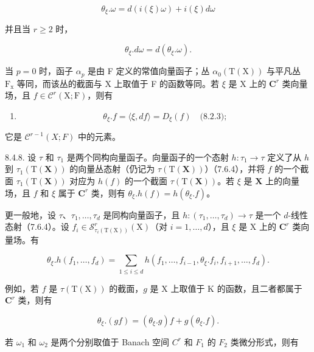 \[
\theta_ {\xi}. \omega = d (i (\xi) \omega) + i (\xi) d \omega\tag{3}
\]

并且当 \(r \geqslant 2\) 时，

\[
\theta_ {\xi}. d \omega = d (\theta_ {\xi}. \omega).\tag{4}
\]

当 \(p=0\) 时，函子 \(\alpha_{p}\) 是由 F 定义的常值向量函子；丛 \(\alpha_{0}(\mathrm{T}(\mathrm{X}))\) 与平凡丛 \(\mathrm{F}_{\mathrm{x}}\) 等同，而该丛的截面与 X 上取值于 F 的函数等同。若 \(\xi\) 是 X 上的 \(\mathbf{C}^{r}\) 类向量场，且 \(f\in\mathcal{C}^{r}(\mathrm{X};\mathrm{F})\)，则有

\begin{enumerate}
\def\labelenumi{(\arabic{enumi})}
\setcounter{enumi}{4}
\tightlist
\item
  \[
  \theta_ {\xi}. f = \langle \xi , d f \rangle = D _ {\xi} (f) \quad \text{(8.2.3)};
  \]
\end{enumerate}

它是 \(\mathcal{C}^{r-1}(X;F)\) 中的元素。

8.4.8. 设 \(\tau\) 和 \(\tau_{1}\) 是两个同构向量函子。向量函子的一个态射 \(h\colon \tau_{1}\to \tau\) 定义了从 \(h\) 到 \(\tau_{1}(\mathrm{T}(\mathbf{X}))\) 的向量丛态射（仍记为 \(\tau (\mathrm{T}(\mathbf{X}))\)）（7.6.4），并将 \(f\) 的一个截面 \(\tau_{1}(\mathrm{T}(\mathbf{X}))\) 对应为 \(h(f)\) 的一个截面 \(\tau (\mathrm{T}(\mathbf{X}))\)。若 \(\xi\) 是 \(\mathbf{X}\) 上的向量场，且 \(f\) 和 \(\xi\) 属于 \(\mathbf{C}^r\) 类，则有 \(\theta_{\xi}.h(f) = h(\theta_{\xi}.f)\)。

更一般地，设 \(\tau\)、\(\tau_{1},\ldots,\tau_{d}\) 是同构向量函子，且 \(h\colon(\tau_{1},\ldots,\tau_{d})\to\tau\) 是一个 \(d\)-线性态射（7.6.4）。设 \(f_{i}\in\mathcal{S}_{\tau_{i}(\mathrm{T}(\mathrm{X}))}^{r}(\mathrm{X})\)（对 \(i=1,\ldots,d\)），且 \(\xi\) 是 X 上的 \(\mathbf{C}^{r}\) 类向量场。有

\[
\theta_ {\xi}. h (f _ {1}, \dots , f _ {d}) = \sum_ {1 \leqslant i \leqslant d} h (f _ {1}, \dots , f _ {i - 1}, \theta_ {\xi}. f _ {i}, f _ {i + 1}, \dots , f _ {d}).\tag{6}
\]

例如，若 \(f\) 是 \(\tau(\mathrm{T}(\mathrm{X}))\) 的截面，\(g\) 是 \(\mathrm{X}\) 上取值于 \(\mathrm{K}\) 的函数，且二者都属于 \(\mathbf{C}^r\) 类，则有

\[
\theta_ {\xi}. (g f) = (\theta_ {\xi}. g) f + g (\theta_ {\xi}. f).\tag{7}
\]

若 \(\omega_{1}\) 和 \(\omega_{2}\) 是两个分别取值于 Banach 空间 \(C^{r}\) 和 \(F_{1}\) 的 \(F_{2}\) 类微分形式，则有

